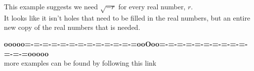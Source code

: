 \documentclass{ximera}
\begin{document}
This example suggests we need $\sqrt{-r}$ for every real number, $r$. \\





It looks like it isn't holes that need to be filled in the real numbers, but an entire new copy of the real numbers that is needed.








\begin{center}
\textbf{\textcolor{green!50!black}{ooooo=-=-=-=-=-=-=-=-=-=-=-=-=ooOoo=-=-=-=-=-=-=-=-=-=-=-=-=ooooo}} \\

more examples can be found by following this link\\ 

\end{center}
\end{document}
